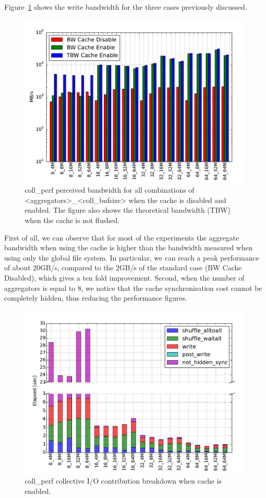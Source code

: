 Figure~\ref{figure: collperf-bw} shows the write bandwidth for the three cases previously discussed.
\begin{figure}[htb]
  \centering
  \includegraphics[width=0.9\columnwidth]{figures/coll_perf_32GB_30sec_bw}
  \caption{coll\_perf perceived bandwidth for all combinations of <aggregators>\_<coll\_bufsize> when the cache is disabled and enabled. The figure also shows the theoretical bandwidth (TBW) when the cache is not flushed.}
  \label{figure: collperf-bw}
\end{figure}
First of all, we can observe that for most of the experiments the aggregate bandwidth when using the cache is higher than the bandwidth measured when using only the global file system. In particular, we can reach a peak performance of about 20GB/s, compared to the 2GB/s of the standard case (BW Cache Disabled), which gives a ten fold improvement. Second, when the number of aggregators is equal to 8, we notice that the cache synchronisation cost cannot be completely hidden, thus reducing the performance figures.
\begin{figure}[htb]
  \centering
  \includegraphics[width=0.9\columnwidth]{figures/coll_perf_32GB_30sec_elapsed_enable}
  \caption{coll\_perf collective I/O contribution breakdown when cache is enabled.}
  \label{figure: collperf-elaps-enable}
\end{figure}
